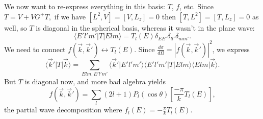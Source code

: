 \documentclass[fontsize=12pt]{scrartcl}
\newcommand{\la}{\langle}
\newcommand{\ra}{\rangle}
\begin{document}
We now want to re-express everything in this basis: $T$, $f$, etc. Since $T=V+VG^+T,$ if we have $[L^2,V]=[V,L_z]=0$ then $[T, L^2]=[T,L_z]=0$ as well, so $T$ is diagonal in the spherical basis, whereas it wasn't in the plane wave: $$\la E'l'm'|T|Elm\ra = T_l(E)\delta_{EE'}\delta_{ll'}\delta_{mm'}.$$ We need to connect $f(\vec{k},\vec{k}')\leftrightarrow T_l(E)$. Since $\frac{d\sigma}{d\Omega}=|f(\vec{k},\vec{k}')|^2$, we express $$\la \vec{k}'|T|\vec{k}\ra = \sum_{Elm, E'l'm'} \la \vec{k}'|E'l'm'\ra \la E'l'm' |T|Elm\ra \la Elm|\vec{k}\ra.$$ But $T$ is diagonal now, and more bad algebra yields $$f(\vec{k},\vec{k}') = \sum_l (2l+1)P_l(\cos\theta)\left[\frac{-\pi}{k}T_l(E)\right],$$ the partial wave decomposition where $f_l(E)=-\frac{\pi}{k}T_l(E).$
\end{document}
